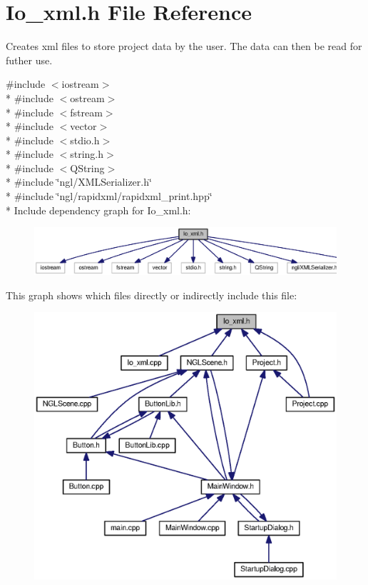 \section{Io\-\_\-xml.\-h File Reference}
\label{_io__xml_8h}


Creates xml files to store project data by the user. The data can then be read for futher use.  


{\ttfamily \#include $<$iostream$>$}\\*
{\ttfamily \#include $<$ostream$>$}\\*
{\ttfamily \#include $<$fstream$>$}\\*
{\ttfamily \#include $<$vector$>$}\\*
{\ttfamily \#include $<$stdio.\-h$>$}\\*
{\ttfamily \#include $<$string.\-h$>$}\\*
{\ttfamily \#include $<$Q\-String$>$}\\*
{\ttfamily \#include \char`\"{}ngl/\-X\-M\-L\-Serializer.\-h\char`\"{}}\\*
{\ttfamily \#include \char`\"{}ngl/rapidxml/rapidxml\-\_\-print.\-hpp\char`\"{}}\\*
Include dependency graph for Io\-\_\-xml.\-h\-:\nopagebreak
\begin{figure}[H]
\begin{center}
\leavevmode
\includegraphics[width=350pt]{_io__xml_8h__incl}
\end{center}
\end{figure}
This graph shows which files directly or indirectly include this file\-:\nopagebreak
\begin{figure}[H]
\begin{center}
\leavevmode
\includegraphics[width=350pt]{_io__xml_8h__dep__incl}
\end{center}
\end{figure}
